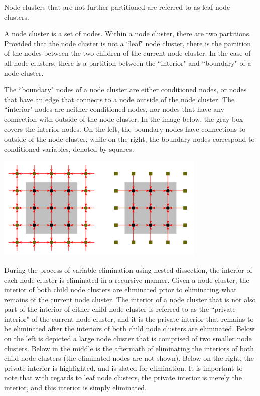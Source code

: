 \documentclass{article}
\begin{document}
Node clusters that are not further partitioned are referred to as leaf node clusters. 

A node cluster is a set of nodes. Within a node cluster, there are two partitions. Provided that the node cluster is not a ``leaf" node cluster, there is the partition of the nodes between the two children of the current node cluster. In the case of all node clusters, there is a partition between the ``interior" and ``boundary" of a node cluster.  

The ``boundary" nodes of a node cluster are either conditioned nodes, or nodes that have an edge that connects to a node outside of the node cluster. The ``interior" nodes are neither conditioned nodes, nor nodes that have any connection with outside of the node cluster. In the image below, the gray box covers the interior nodes. On the left, the boundary nodes have connections to outside of the node cluster, while on the right, the boundary nodes correspond to conditioned variables, denoted by squares.

\begin{center}
\includegraphics[width = 0.75\textwidth]{node_cluster_interior_and_boundary}
\end{center}

During the process of variable elimination using nested dissection, the interior of each node cluster is eliminated in a recursive manner. Given a node cluster, the interior of both child node clusters are eliminated prior to eliminating what remains of the current node cluster. The interior of a node cluster that is not also part of the interior of either child node cluster is referred to as the ``private interior" of the current node cluster, and it is the private interior that remains to be eliminated after the interiors of both child node clusters are eliminated. Below on the left is depicted a large node cluster that is comprised of two smaller node clusters. Below in the middle is the aftermath of eliminating the interiors of both child node clusters (the eliminated nodes are not shown). Below on the right, the private interior is highlighted, and is slated for elimination. It is important to note that with regards to leaf node clusters, the private interior is merely the interior, and this interior is simply eliminated.
\end{document}
